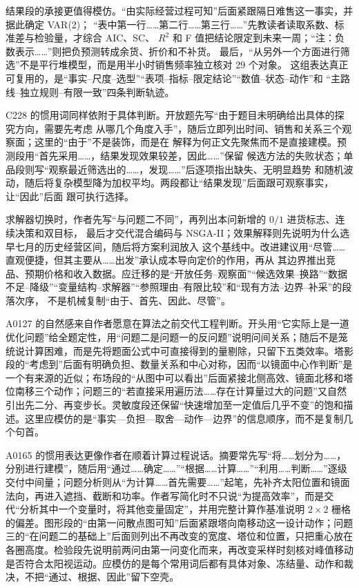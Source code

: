 \documentclass[UTF8,a4paper,12pt]{ctexart}
\begin{document}
结果段的承接更值得模仿。“由实际经营过程可知”后面紧跟隔日难售这一事实，并据此确定 VAR(2)；
“表中第一行……第二行……第三行……”先教读者读取系数、标准差与检验量，才综合 AIC、SC、
$R^2$ 和 F 值把结论限定到未来一周；“注：负数表示……”则把负预测转成余货、折价和不补货。
最后，“从另外一个方面进行筛选”不是平行堆模型，而是用半小时销售频率独立核对 29 个对象。
这组表达真正可复用的，是“事实--尺度--选型”“表项--指标--限定结论”“数值--状态--动作”和
“主路线--独立规则--有限一致”四条判断轨迹。

C228 的惯用词同样依附于具体判断。开放题先写“由于题目未明确给出具体的探究方向，需要先考虑
从哪几个角度入手”，随后立即列出时间、销售和关系三个观察面；这里的“由于”不是装饰，而是在
解释为何正文先聚焦而不是直接建模。预测段用“首先采用……，结果发现效果较差，因此……”保留
候选方法的失败状态；单品段则写“观察最近筛选出的……，发现……”后逐项指出缺失、无明显趋势
和随机波动，随后将复杂模型降为加权平均。两段都让“结果发现”后面跟可观察事实，让“因此”后面
跟可执行选择。

求解器切换时，作者先写“与问题二不同”，再列出本问新增的 $0/1$ 进货标志、连续决策和双目标，
最后才交代混合编码与 NSGA-II；效果解释则先说明为什么选早七月的历史经营区间，随后将方案利润放入
这个基线中。改进建议用“尽管……直观便捷，但其主要从……出发”承认成本导向定价的作用，再从
其边界推出竞品、预期价格和收入数据。应迁移的是“开放任务--观察面”“候选效果--换路”“数据
不足--降级”“变量结构--求解器”“参照理由--有限比较”和“现有方法--边界--补采”的段落次序，
不是机械复制“由于、首先、因此、尽管”。

A0127 的自然感来自作者愿意在算法之前交代工程判断。开头用“它实际上是一道优化问题”给全题定性，用“问题二是问题一的反问题”说明问间关系；随后不是笼统说计算困难，而是先将题面公式中可直接得到的量剔除，只留下五类效率。塔影段的“考虑到”后面有明确负担、数量关系和中心对称，因而“以镜面中心作判断”是一个有来源的近似；布场段的“从图中可以看出”后面紧接北侧高效、镜面北移和塔位南移三个动作；问题三的“若直接采用遍历法……存在计算量过大的问题”又自然引出先二分、再变步长。灵敏度段还保留“快速增加至一定值后几乎不变”的饱和描述。这里应模仿的是“事实—负担—取舍—动作—边界”的信息顺序，而不是复制几个句首。

A0165 的惯用表达更像作者在顺着计算过程说话。摘要常先写“将……划分为……，分别进行建模”，随后用“通过……确定……”“根据……计算……”“利用……判断……”逐级交付中间量；问题分析则从“为计算……首先需要……”起笔，先补齐太阳位置和镜面法向，再进入遮挡、截断和功率。作者写简化时不只说“为提高效率”，而是交代“分析其中一个变量时，将其他变量固定”，并用完整计算作基准说明 $2\times2$ 栅格的偏差。图形段的“由第一问散点图可知”后面紧跟塔向南移动这一设计动作；问题三的“在问题二的基础上”后面则列出不再改变的宽度、塔位和位置，只把重心放在各圈高度。检验段先说明前两问由第一问变化而来，再改变采样时刻核对峰值移动是否符合太阳视运动。应模仿的是每个常用词后都有具体对象、冻结量、动作和裁决，不把“通过、根据、因此”留下空壳。
\end{document}
